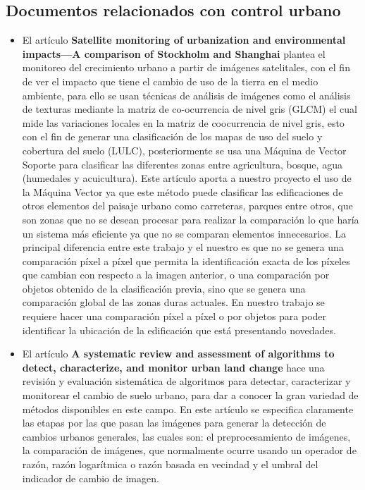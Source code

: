 \subsection{Documentos relacionados con control urbano}
 \begin{itemize}
        \item El artículo \textbf{Satellite monitoring of urbanization and environmental impacts—A comparison of Stockholm and Shanghai }\cite{HAAS2015138} plantea el monitoreo del crecimiento urbano a partir de imágenes satelitales, con el fin de ver el impacto que tiene el cambio de uso de la tierra en el medio ambiente, para ello se usan técnicas de análisis de imágenes como el análisis de texturas mediante la matriz de co-ocurrencia de nivel gris (GLCM) el cual mide las variaciones locales en la matriz de coocurrencia de nivel gris, esto con el fin de generar una clasificación de los mapas de uso del suelo y cobertura del suelo (LULC), posteriormente se usa una Máquina de Vector Soporte para clasificar las diferentes zonas entre agricultura, bosque, agua (humedales y acuicultura).
        Este artículo aporta a nuestro proyecto el uso de la Máquina Vector ya que este método puede clasificar las edificaciones de otros elementos del paisaje urbano como carreteras, parques entre otros, que son zonas que no se desean procesar para realizar la comparación lo que haría un sistema más eficiente ya que no se comparan elementos innecesarios.
        La principal diferencia entre este trabajo y el nuestro es que no se genera una comparación píxel a píxel que permita la identificación exacta de los píxeles que cambian con respecto a la imagen anterior, o una comparación por objetos obtenido de la clasificación previa, sino que se genera una comparación global de las zonas duras actuales. En nuestro trabajo se requiere hacer una comparación píxel a píxel o por objetos para poder identificar la ubicación de la edificación que está presentando novedades.
        
        \item El artículo \textbf{A systematic review and assessment of algorithms to detect, characterize, and monitor urban land change}\cite{REBA2020111739} hace una revisión y evaluación sistemática de algoritmos para detectar, caracterizar y monitorear el cambio de suelo urbano, para dar a conocer la gran variedad de métodos disponibles en este campo.  En este artículo se especifica claramente las etapas por las que pasan las imágenes para generar la detección de cambios urbanos generales, las cuales son: el preprocesamiento de imágenes, la comparación de imágenes, que normalmente ocurre usando un operador de razón, razón logarítmica o razón basada en vecindad y el umbral del indicador de cambio de imagen.
        

\end{itemize}
